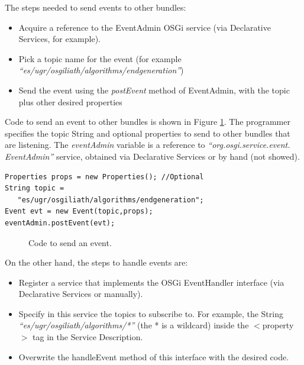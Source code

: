 The steps needed to send events to other bundles:
\begin{itemize}
\item Acquire a reference to the EventAdmin OSGi service (via Declarative Services, for example).
\item Pick a topic name for the event (for example {\em ``es/ugr/osgiliath/algorithms/endgeneration''})
\item Send the event using the {\em postEvent} method of EventAdmin, with the topic plus other desired properties %
\end{itemize}

Code to send an event to other bundles is shown in Figure \ref{fig:OSGIpostevent}. The programmer specifies the topic String and optional properties to send to other bundles that are listening. The {\em eventAdmin} variable is a reference to {\em ``org.osgi.service.event. EventAdmin''} service, obtained via Declarative Services or by hand (not showed).


\newsavebox{\mintedboxOSGIpostevent}
\begin{lrbox}{\mintedboxOSGIpostevent}
\begin{minipage}{10cm}
\begin{verbatim}
Properties props = new Properties(); //Optional
String topic = 
   "es/ugr/osgiliath/algorithms/endgeneration";
Event evt = new Event(topic,props);
eventAdmin.postEvent(evt);
\end{verbatim}
\end{minipage}
\end{lrbox}

\begin{figure}
\usebox{\mintedboxOSGIpostevent}
\caption{Code to send an event.}
\label{fig:OSGIpostevent} 
\end{figure}
		
On the other hand, the steps to handle events are:
\begin{itemize}
\item Register a service that implements the OSGi EventHandler interface (via Declarative Services or manually).
\item Specify in this service the topics to subscribe to. For example, the String {\em ``es/ugr/osgiliath/algorithms/*''} (the * is a wildcard) inside the $<$property$>$ tag in the Service Description.
\item Overwrite the handleEvent method of this interface with the desired code.
\end{itemize}

